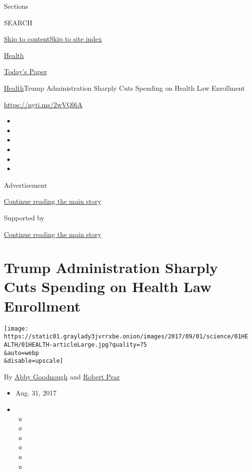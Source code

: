 Sections

SEARCH

\protect\hyperlink{site-content}{Skip to
content}\protect\hyperlink{site-index}{Skip to site index}

\href{https://www.nytimes3xbfgragh.onion/section/health}{Health}

\href{https://myaccount.nytimes3xbfgragh.onion/auth/login?response_type=cookie\&client_id=vi}{}

\href{https://www.nytimes3xbfgragh.onion/section/todayspaper}{Today's
Paper}

\href{/section/health}{Health}\textbar{}Trump Administration Sharply
Cuts Spending on Health Law Enrollment

\url{https://nyti.ms/2wVQl6A}

\begin{itemize}
\item
\item
\item
\item
\item
\item
\end{itemize}

Advertisement

\protect\hyperlink{after-top}{Continue reading the main story}

Supported by

\protect\hyperlink{after-sponsor}{Continue reading the main story}

\hypertarget{trump-administration-sharply-cuts-spending-on-health-law-enrollment}{%
\section{Trump Administration Sharply Cuts Spending on Health Law
Enrollment}\label{trump-administration-sharply-cuts-spending-on-health-law-enrollment}}

\texttt{[image: https://static01.graylady3jvrrxbe.onion/images/2017/09/01/science/01HEALTH/01HEALTH-articleLarge.jpg?quality=75\\\&auto=webp\\\&disable=upscale]}

By \href{http://www.nytimes3xbfgragh.onion/by/abby-goodnough}{Abby
Goodnough} and
\href{https://www.nytimes3xbfgragh.onion/by/robert-pear}{Robert Pear}

\begin{itemize}
\item
  Aug. 31, 2017
\item
  \begin{itemize}
  \item
  \item
  \item
  \item
  \item
  \item
  \end{itemize}
\end{itemize}

